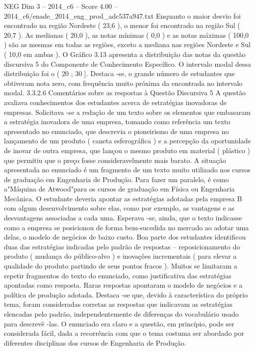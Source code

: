 \begin{textsample}{NEG Dim 3 – 2014\_c6 – Score 4.00 – 2014\_c6/enade\_2014\_eng\_prod\_adc537a947.txt}
Enquanto o maior desvio foi encontrado na região Nordeste ( 23,6 ), o menor foi encontrado na região Sul ( 20,7 ).
As medianas ( 20,0 ), as notas mínimas ( 0,0 ) e as notas máximas ( 100,0 ) são as mesmas em todas as regiões, exceto a mediana nas regiões Nordeste e Sul ( 10,0 em ambas ).
O Gráfico 3.13 apresenta a distribuição das notas da questão discursiva 5 do Componente de Conhecimento Específico.
O intervalo modal dessa distribuição foi o ( 20 ; 30 ].
Destaca -se, o grande número de estudantes que obtiveram nota zero, com frequência muito próxima da encontrada no intervalo modal. 3.3.2.6 Comentários sobre as respostas à Questão Discursiva 5 A questão avaliava conhecimentos dos estudantes acerca de estratégias inovadoras de empresas.
Solicitava -se a redação de um texto sobre os elementos que embasaram a estratégia inovadora de uma empresa, tomando como referência um texto apresentado no enunciado, que descrevia o pioneirismo de uma empresa no lançamento de um produto ( caneta esferográfica ) e a percepção da oportunidade de inovar de outra empresa, que lançou o mesmo produto em material ( plástico ) que permitiu que o preço fosse consideravelmente mais barato.
A situação apresentada no enunciado é um fragmento de um texto muito utilizado nos cursos de graduação em Engenharia de Produção.
Para fazer um paralelo, é como a"Máquina de Atwood"para os cursos de graduação em Física ou Engenharia Mecânica.
O estudante deveria apontar as estratégias adotadas pela empresa B com algum desenvolvimento sobre elas, como por exemplo, as vantagens e as desvantagens associadas a cada uma.
Esperava -se, ainda, que o texto indicasse como a empresa se posicionou de forma bem-sucedida no mercado ao adotar uma delas, o modelo de negócios de baixo custo.
Boa parte dos estudantes identificou duas das estratégias indicadas pelo padrão de respostas – reposicionamento do produto ( mudança do público-alvo ) e inovações incrementais ( para elevar a qualidade do produto partindo de seus pontos fracos ).
Muitos se limitaram a repetir fragmentos do texto do enunciado, como justificativa das estratégias apontadas como resposta.
Raras respostas apontaram o modelo de negócios e a política de produção adotada.
Destaca -se que, devido à característica do próprio tema, foram consideradas corretas as respostas que indicavam as estratégias elencadas pelo padrão, independentemente de diferenças do vocabulário usado para descrevê -las.
O enunciado era claro e a questão, em princípio, pode ser considerada fácil, dada a recorrência com que o tema costuma ser abordado por diferentes disciplinas dos cursos de Engenharia de Produção.

\end{textsample}
